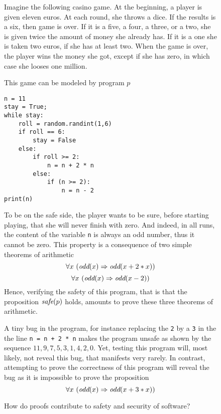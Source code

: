 \begin{figure}
\begin{framed}
Imagine the following casino game. At the beginning, a player is given
eleven euros. At each round, she throws a dice. If the results is a
six, then game is over.  If it is a five, a four, a three, or a two,
she is given twice the amount of money she already has. If it is a one
she is taken two euros, if she has at least two.  When the game is
over, the player wins the money she got, except if she has zero, in
which case she looses one million.

This game can be modeled by program $p$
\begin{verbatim}
n = 11
stay = True;
while stay: 
    roll = random.randint(1,6)
    if roll == 6:
        stay = False
    else:
        if roll >= 2:
            n = n + 2 * n
        else:
            if (n >= 2):
                n = n - 2
print(n)
\end{verbatim}

To be on the safe side, the player wants to be sure, before starting
playing, that she will never finish with zero.  And indeed, in all runs,
the content of the variable {\tt n} is always an odd number, thus it
cannot be zero. This property is a consequence of two simple
theorems of arithmetic
$$\forall x~(\mbox{\it odd}(x) \Rightarrow \mbox{\it odd}(x + 2 * x))$$
$$\forall x~(\mbox{\it odd}(x) \Rightarrow \mbox{\it odd}(x - 2))$$
Hence, verifying the safety of this program, that is that the
proposition 
${\mbox{\it safe}}(p)$ holds, 
amounts to prove these three theorems of arithmetic.

A tiny bug in the program, for instance replacing the {\tt 2} by a
{\tt 3} in the the line {\tt n = n + 2 * n} makes the program unsafe
as shown by the sequence $11, 9, 7, 5, 3, 1, 4, 2, 0$. Yet, testing
this program will, most likely, not reveal this bug, that manifests
very rarely.  In contrast, attempting to prove the correctness of this
program will
reveal the bug as it is impossible to prove the proposition
$$\forall x~(\mbox{\it odd}(x) \Rightarrow \mbox{\it odd}(x + 3 * x))$$
\caption{How do proofs contribute to safety and security of software?\label{safety}}
\end{framed}
\end{figure}


